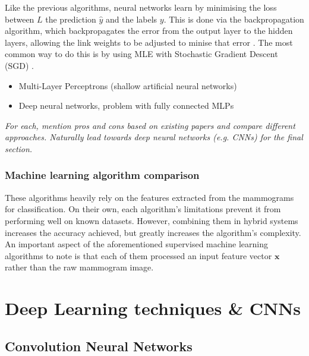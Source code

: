 Like the previous algorithms, neural networks learn by minimising the loss between $L$ the prediction $\hat{y}$ and the labels $y$. This is done via the backpropagation algorithm, which backpropagates the error from the output layer to the hidden layers, allowing the link weights to be adjusted to minise that error \cite{russell2002artificial}. The most common way to do this is by using MLE with Stochastic Gradient Descent (SGD) \cite{Litjens2017}.

\begin{itemize}
    \item Multi-Layer Perceptrons (shallow artificial neural networks)
    \item Deep neural networks, problem with fully connected MLPs
\end{itemize}

\textit{For each, mention pros and cons based on existing papers and compare different approaches. Naturally lead towards deep neural networks (e.g. CNNs) for the final section.}

\subsubsection{Machine learning algorithm comparison}

These algorithms heavily rely on the features extracted from the mammograms for classification. On their own, each algorithm's limitations prevent it from performing well on known datasets. However, combining them in hybrid systems increases the accuracy achieved, but greatly increases the algorithm's complexity.\\

An important aspect of the aforementioned supervised machine learning algorithms to note is that each of them processed an input feature vector $\textbf{x}$ rather than the raw mammogram image.




\section{Deep Learning techniques \& CNNs}
\label{sec:litsurvey-DLtechniques-CNN}

\subsection{Convolution Neural Networks}

